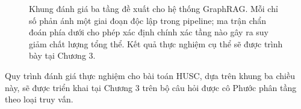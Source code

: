\documentclass[12pt,a4paper]{report}
\theoremstyle{plain}
\theoremstyle{definition}
\begin{document}
\begin{figure}[htbp]
		\caption{Khung đánh giá ba tầng đề xuất cho hệ thống GraphRAG. Mỗi chỉ số
			phản ánh một giai đoạn độc lập trong pipeline; ma trận chẩn đoán phía dưới
			cho phép xác định chính xác tầng nào gây ra suy giảm chất lượng tổng thể.
			Kết quả thực nghiệm cụ thể sẽ được trình bày tại Chương 3.}
		\label{fig:evaluation_3metrics}
	\end{figure}
	
	Quy trình đánh giá thực nghiệm cho bài toán HUSC, dựa trên khung ba chiều này,
	sẽ được triển khai tại Chương 3 trên bộ câu hỏi được cô Phước phân
	tầng theo loại truy vấn.
	
	\clearpage
	
\end{document}
